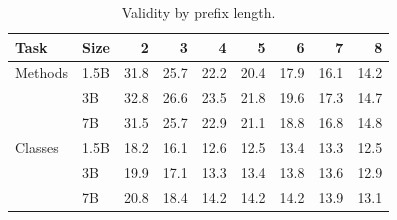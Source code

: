 \begin{table}[t]
\centering
\caption{Validity by prefix length.}
\label{tab:name-validity-by-prefix}
\setlength{\tabcolsep}{3.4pt}
\small
\begin{tabular}{llrrrrrrr}
\toprule
\textbf{Task} & \textbf{Size} & 2 & 3 & 4 & 5 & 6 & 7 & 8 \\
\midrule
Methods & 1.5B & 31.8 & 25.7 & 22.2 & 20.4 & 17.9 & 16.1 & 14.2 \\
 & 3B & 32.8 & 26.6 & 23.5 & 21.8 & 19.6 & 17.3 & 14.7 \\
 & 7B & 31.5 & 25.7 & 22.9 & 21.1 & 18.8 & 16.8 & 14.8 \\
\midrule
Classes & 1.5B & 18.2 & 16.1 & 12.6 & 12.5 & 13.4 & 13.3 & 12.5 \\
 & 3B & 19.9 & 17.1 & 13.3 & 13.4 & 13.8 & 13.6 & 12.9 \\
 & 7B & 20.8 & 18.4 & 14.2 & 14.2 & 14.2 & 13.9 & 13.1 \\
\bottomrule
\end{tabular}
\end{table}
